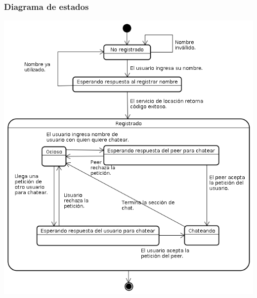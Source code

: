 \subsubsection{Diagrama de estados}
\begin{center}
\small\includegraphics[scale=0.65]{./Images/DiagramaDeEstados}
\end{center}

